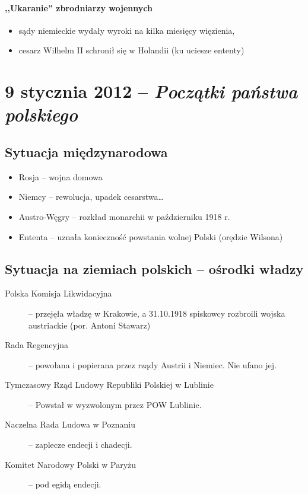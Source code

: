 \documentclass [a4paper, 11pt, oneside]{book}
\begin{document}
            \subsubsection{,,Ukaranie'' zbrodniarzy wojennych} %
            \label{ssub:_ukaranie_zbrodniarzy_wojennych}
                \begin{itemize}
                    \item sądy niemieckie wydały wyroki na kilka miesięcy więzienia,
                    \item cesarz Wilhelm II schronił się w Holandii (ku uciesze ententy)
                \end{itemize}
\chapter{9 stycznia 2012 -- \textit{Początki państwa polskiego}} %
\label{cha:9_stycznia_2012_textit}
    \section{Sytuacja międzynarodowa} %
    \label{sec:sytuacja_mi_dzynarodowa}
        \begin{itemize}
            \item Rosja -- wojna domowa
            \item Niemcy -- rewolucja, upadek cesarstwa\dots
            \item Austro-Węgry -- rozkład monarchii w październiku 1918 r.
            \item Ententa -- uznała konieczność powstania wolnej Polski (orędzie Wilsona)
        \end{itemize}
    \section{Sytuacja na ziemiach polskich -- ośrodki władzy} %
    \label{sec:sytuacja_na_ziemiach_polskich_o_rodki_w_adzy}
        \begin{description}
            \item[Polska Komisja Likwidacyjna] -- przejęła władzę w Krakowie, a 31.10.1918 spiskowcy rozbroili wojska austriackie (por. Antoni Stawarz)
            \item[Rada Regencyjna] -- powołana i popierana przez rządy Austrii i Niemiec. Nie ufano jej. 
            \item[Tymczasowy Rząd Ludowy Republiki Polskiej w Lublinie] -- Powstał w wyzwolonym przez POW Lublinie.
            \item[Naczelna Rada Ludowa w Poznaniu] -- zaplecze endecji i chadecji.
            \item[Komitet Narodowy Polski w Paryżu] -- pod egidą endecji.
        \end{description}
\end{document}
